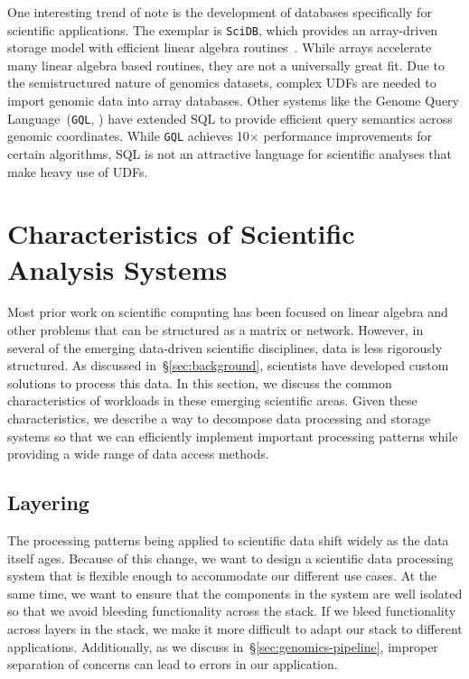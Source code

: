 \documentclass{sig-alternate}
\begin{document}
One interesting trend of note is the development of databases specifically for scientific applications.
The exemplar is \linebreak \texttt{SciDB}, which provides an array-driven storage model with efficient
linear algebra routines~\cite{brown10}. While arrays accelerate many linear algebra based routines, they
are not a universally great fit. Due to the semistructured nature of genomics datasets, complex UDFs are needed
to import genomic data into array databases. Other systems like the Genome Query Language~(\texttt{GQL},
\cite{kozanitis14}) have extended SQL to provide efficient query semantics across
genomic coordinates. While \texttt{GQL} achieves 10$\times$ performance improvements for certain
algorithms, SQL is not an attractive language for scientific analyses that make heavy use of UDFs.

\section{Characteristics of Scientific \\ Analysis Systems}
\label{sec:principles}

Most prior work on scientific computing has been focused on linear algebra and other problems that can
be structured as a matrix or network. However, in several of the emerging data-driven scientific
disciplines, data is less rigorously structured. As discussed in~\S\ref{sec:background}, scientists have
developed custom solutions to process this data. In this
section, we discuss the common characteristics of workloads in these emerging scientific areas. Given
these characteristics, we describe a way to decompose data processing and storage systems so that
we can efficiently implement important processing patterns while providing a wide range of data access
methods.

\subsection{Layering}
\label{sec:layering}

The processing patterns being applied to scientific data shift widely
as the data itself ages. Because of this change, we want to design a scientific data processing system that is
flexible enough to accommodate our different use cases. At the same time, we want to ensure that the
components in the system are well isolated so that we avoid bleeding functionality across the stack. If
we bleed functionality across layers in the stack, we make it more difficult to adapt our stack to different
applications. Additionally, as we discuss in~\S\ref{sec:genomics-pipeline}, improper separation of
concerns can lead to errors in our application.
\end{document}
